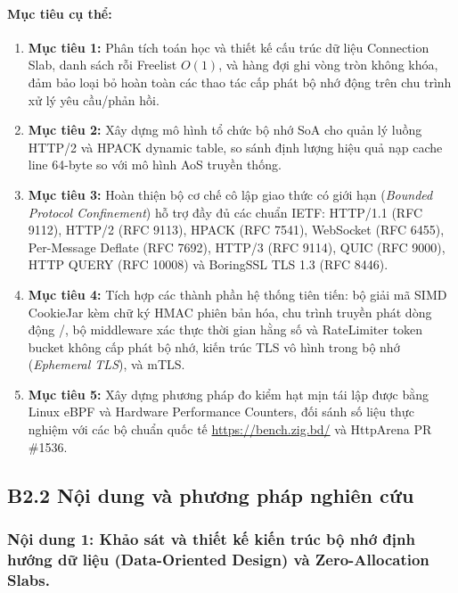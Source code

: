 \documentclass[letterpaper]{article}
\begin{document}
\paragraph{Mục tiêu cụ thể:}
\begin{enumerate}
    \item \textbf{Mục tiêu 1:} Phân tích toán học và thiết kế cấu trúc dữ liệu Connection Slab, danh sách rỗi Freelist $O(1)$, và hàng đợi ghi vòng tròn không khóa, đảm bảo loại bỏ hoàn toàn các thao tác cấp phát bộ nhớ động trên chu trình xử lý yêu cầu/phản hồi.
    \item \textbf{Mục tiêu 2:} Xây dựng mô hình tổ chức bộ nhớ SoA cho quản lý luồng HTTP/2 và HPACK dynamic table, so sánh định lượng hiệu quả nạp cache line 64-byte so với mô hình AoS truyền thống.
    \item \textbf{Mục tiêu 3:} Hoàn thiện bộ cơ chế cô lập giao thức có giới hạn (\emph{Bounded Protocol Confinement}) hỗ trợ đầy đủ các chuẩn IETF: HTTP/1.1 (RFC 9112), HTTP/2 (RFC 9113), HPACK (RFC 7541), WebSocket (RFC 6455), Per-Message Deflate (RFC 7692), HTTP/3 (RFC 9114), QUIC (RFC 9000), HTTP QUERY (RFC 10008) và BoringSSL TLS 1.3 (RFC 8446).
    \item \textbf{Mục tiêu 4:} Tích hợp các thành phần hệ thống tiên tiến: bộ giải mã SIMD CookieJar kèm chữ ký HMAC phiên bản hóa, chu trình truyền phát dòng động /, bộ middleware xác thực thời gian hằng số và RateLimiter token bucket không cấp phát bộ nhớ, kiến trúc TLS vô hình trong bộ nhớ (\emph{Ephemeral TLS}), và mTLS.
    \item \textbf{Mục tiêu 5:} Xây dựng phương pháp đo kiểm hạt mịn tái lập được bằng Linux eBPF và Hardware Performance Counters, đối sánh số liệu thực nghiệm với các bộ chuẩn quốc tế \url{https://bench.zig.bd/} và HttpArena PR \#1536.
\end{enumerate}

\subsection{B2.2 Nội dung và phương pháp nghiên cứu}

\subsubsection{Nội dung 1: Khảo sát và thiết kế kiến trúc bộ nhớ định hướng dữ liệu (Data-Oriented Design) và Zero-Allocation Slabs.}
\end{document}

